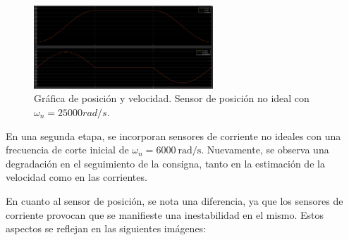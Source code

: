 \documentclass{article}
\begin{document}
 \begin{figure}[H]
    \centering
    \includegraphics[width=0.6\textwidth]{Imagenes/5_posNI_25000_pw.png}
    \caption{Gráfica de posición y velocidad. Sensor de posición no ideal con $\omega_n = 25000 rad/s$.}
\end{figure}

En una segunda etapa, se incorporan sensores de corriente no ideales con una frecuencia de corte inicial de $\omega_n = 6000 \ \text{rad/s}$. Nuevamente, se observa una degradación en el seguimiento de la consigna, tanto en la estimación de la velocidad como en las corrientes. 

En cuanto al sensor de posición, se nota una diferencia, ya que los sensores de corriente provocan que se manifieste una inestabilidad en el mismo. Estos aspectos se reflejan en las siguientes imágenes:
\end{document}
